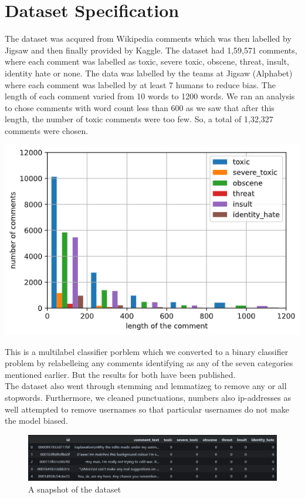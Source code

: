 \documentclass[11pt]{article}
\begin{document}
\section{Dataset Specification}
The dataset was acqured from Wikipedia comments which was then labelled by Jigsaw and then finally provided by Kaggle. The dataset had 1,59,571 comments, where each comment was labelled as toxic, severe toxic, obscene, threat, insult, identity hate or none. 
The data was labelled by the teams at Jigsaw (Alphabet) where each comment was labelled by at least 7 humans to reduce bias.
The length of each comment varied from 10 words to 1200 words. 
We ran an analysis to chose comments with
word count less than 600 as we saw that after this length, the number of toxic 
comments were too few. So, a total of 1,32,327 comments were chosen.
\begin{center}
	\includegraphics[scale=0.5]{figs/distribution.png}
\end{center}
This is a multilabel classifier porblem which we converted to a binary classifier problem by relabelleing any comments identifying as any of the seven categories mentioned earlier. But the results for both have been published. \\
The dataset also went through stemming and lemmatizeg to remove any or all stopwords. Furthermore, we cleaned punctuations, numbers also ip-addresses as well attempted to remove usernames so that particular usernames do not make the model biased.\\
\begin{figure}
	\begin{center}
		\includegraphics[scale=0.35]{figs/data_set.png}
		\caption{A snapshot of the dataset}
		\label{fig:dataset}
	\end{center}
\end{figure}
\end{document}
